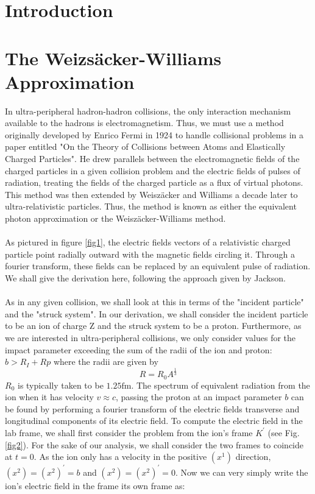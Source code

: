 \documentclass{article}
\begin{document}
\begin{multicols}{2}

\section{Introduction} 


\section{The Weizsäcker-Williams Approximation}

In ultra-peripheral hadron-hadron collisions, the only interaction mechanism available to the hadrons is electromagnetism. Thus, we must use a method originally developed by Enrico Fermi in 1924 to handle collisional problems in a paper entitled "On the Theory of Collisions between Atoms and Elastically Charged Particles".\cite{fermi} He drew parallels between the electromagnetic fields of the charged particles in a given collision problem and the electric fields of pulses of radiation, treating the fields of the charged particle as a flux of virtual photons. This method was then extended by Weiszäcker and Williams a decade later to ultra-relativistic particles. Thus, the method is known as either the equivalent photon approximation or the Weiszäcker-Williams method.
\\\\
As pictured in figure \ref{fig1}, the electric fields vectors of a relativistic charged particle point radially outward with the magnetic fields circling it. Through a fourier transform, these fields can be replaced by an equivalent pulse of radiation. We shall give the derivation here, following the approach given by Jackson. \cite{jackson}
\\\\
As in any given collision, we shall look at this in terms of the "incident particle" and the "struck system". In our derivation, we shall consider the incident particle to be an ion of charge Z and the struck system to be a proton. Furthermore, as we are interested in ultra-peripheral collisions, we only consider values for the impact parameter exceeding the sum of the radii of the ion and proton: $b > R_{I} + R{p}$ where the radii are given by \begin{equation}
R = R_{0} A^{\frac{1}{3}}
\end{equation}
$R_{0}$ is typically taken to be $1.25 \unit{\femto \meter}$. \cite{r0} The spectrum of equivalent radiation from the ion when it has velocity $v \approx c$, passing the proton at an impact parameter $b$ can be found by performing a fourier transform of the electric fields transverse and longitudinal components of its electric field. To compute the electric field in the lab frame, we shall first consider the problem from the ion's frame $K^{'}$ (see Fig. \ref{fig2}). For the sake of our analysis, we shall consider the two frames to coincide at $t = 0$. As the ion only has a velocity in the positive $(x^{1})$ direction, $(x^{2}) = (x^{2})^{'}= b$ and $(x^{2}) = (x^{2})^{'}= 0$. Now we can very simply write the ion's electric field in the frame its own frame as:


\end{multicols}
\end{document}
